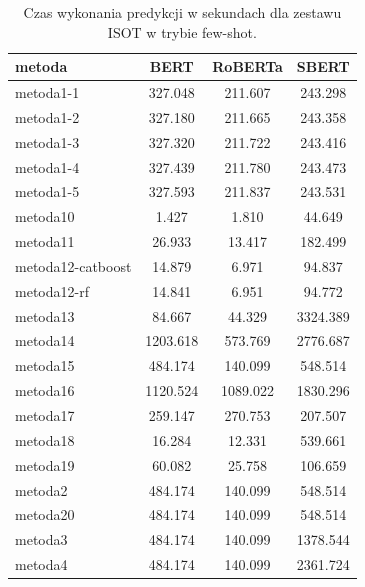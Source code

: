 \begin{table}[H]
	\centering
	\caption{Czas wykonania predykcji w sekundach dla zestawu ISOT w trybie few-shot.}
	\label{tab:execution_time_few_shot_isot}
	\small
	\begin{tabular}{lccc}
		\toprule
		\textbf{metoda}   & \textbf{BERT} & \textbf{RoBERTa} & \textbf{SBERT} \\
		\midrule
		metoda1-1         & 327.048       & 211.607          & 243.298        \\
		metoda1-2         & 327.180       & 211.665          & 243.358        \\
		metoda1-3         & 327.320       & 211.722          & 243.416        \\
		metoda1-4         & 327.439       & 211.780          & 243.473        \\
		metoda1-5         & 327.593       & 211.837          & 243.531        \\
		metoda10          & 1.427         & 1.810            & 44.649         \\
		metoda11          & 26.933        & 13.417           & 182.499        \\
		metoda12-catboost & 14.879        & 6.971            & 94.837         \\
		metoda12-rf       & 14.841        & 6.951            & 94.772         \\
		metoda13          & 84.667        & 44.329           & 3324.389       \\
		metoda14          & 1203.618      & 573.769          & 2776.687       \\
		metoda15          & 484.174       & 140.099          & 548.514        \\
		metoda16          & 1120.524      & 1089.022         & 1830.296       \\
		metoda17          & 259.147       & 270.753          & 207.507        \\
		metoda18          & 16.284        & 12.331           & 539.661        \\
		metoda19          & 60.082        & 25.758           & 106.659        \\
		metoda2           & 484.174       & 140.099          & 548.514        \\
		metoda20          & 484.174       & 140.099          & 548.514        \\
		metoda3           & 484.174       & 140.099          & 1378.544       \\
		metoda4           & 484.174       & 140.099          & 2361.724       \\

\end{tabular}
\end{table}
